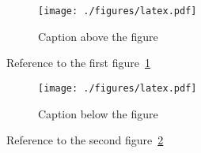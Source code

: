 \documentclass[12pt, a4paper]{article}
\begin{document}
\begin{figure}
	\caption{\label{fig1} Caption above the figure}
	\texttt{[image: ./figures/latex.pdf]}
\end{figure}

Reference to the first figure~\ref{fig1}

\setcounter{figure}{2}
\begin{figure}
	\texttt{[image: ./figures/latex.pdf]}
	\caption{\label{fig2} Caption below the figure}
\end{figure}

Reference to the second figure~\ref{fig2}
\end{document}
